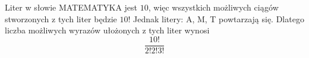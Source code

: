 \medskip
{} 
\medskip

Liter w słowie MATEMATYKA jest $10$, więc wszystkich możliwych ciągów stworzonych z tych liter będzie $10!$
Jednak litery: A, M, T powtarzają się. Dlatego liczba możliwych wyrazów ułożonych z tych liter wynosi
$$
\frac{10!}{2!2!3!}
$$

